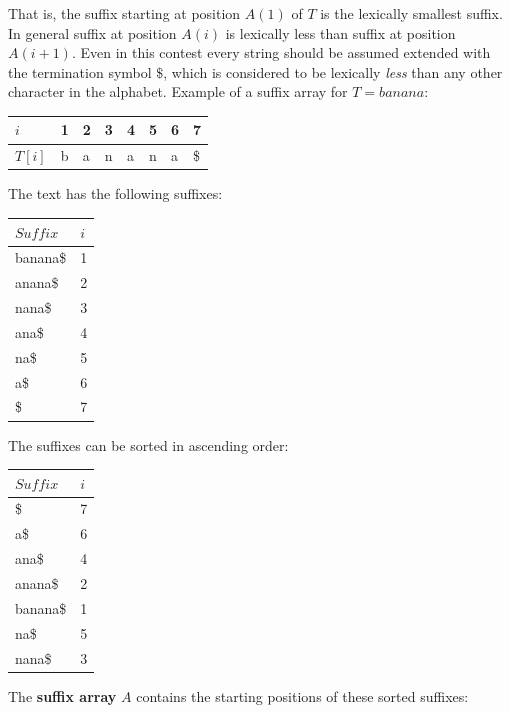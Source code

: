\documentclass[a4paper,12pt, oneside]{article}
\begin{document}
That is, the suffix starting at position $A(1)$ of $T$ is the lexically smallest suffix. In general suffix at position $A(i)$ is lexically less than suffix at position $A(i+1)$. Even in this contest every string should be assumed extended with the termination symbol $\$$, which is considered to be lexically \textit{less} than any other character in the alphabet. \newline
Example of a suffix array for $T = banana$:

\begin{table}[h!]
\centering
\label{suffix-array1}
\begin{tabular}{llllllll}
$i$ & 1 & 2 & 3 & 4 & 5 & 6 & 7 \\
\hline
$T[i]$ & b & a & n & a & n & a & \$
\end{tabular}
\end{table}

The text has the following suffixes:

\begin{table}[h!]
\centering
\label{suffix-array2}
\begin{tabular}{ll}
$Suffix$   & $i$ \\
\hline
banana\$ & 1 \\
anana\$  & 2 \\
nana\$   & 3 \\
ana\$    & 4 \\
na\$     & 5 \\
a\$      & 6 \\
\$       & 7
\end{tabular}
\end{table}

\newpage
The suffixes can be sorted in ascending order:

\begin{table}[h!]
\centering
\label{suffix-array3}
\begin{tabular}{ll}
$Suffix$   & $i$ \\
\hline
\$       & 7 \\
a\$      & 6 \\
ana\$    & 4 \\
anana\$  & 2 \\
banana\$ & 1 \\
na\$     & 5 \\
nana\$   & 3
\end{tabular}
\end{table}

The \textbf{suffix array} $A$ contains the starting positions of these sorted suffixes:
\end{document}
